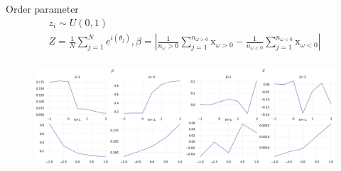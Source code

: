 \documentclass[10pt,aspectratio=43,mathserif,table]{beamer}
\begin{document}
\begin{frame}{Order parameter}
    $$
    \begin{array}{c}
        z_i\sim U\left( 0,1 \right)\\
        Z=\frac{1}{N}\sum_{j=1}^N{e^{i\left( \theta _j \right)}},  \beta =\left| \frac{1}{n_{\omega}>0}\sum_{j=1}^{n_{\omega >0}}{\mathrm{x}_{\omega >0}}-\frac{1}{n_{\omega <0}}\sum_{j=1}^{n_{\omega <0}}{\mathrm{x}_{\omega <0}} \right|\\
    \end{array}
    $$

    \begin{figure}
        \centering
        \includegraphics[width=\textwidth]{
            FreqCoupledChiralSwarmalators3DUrandbetaZ.png
        }
    \end{figure}
\end{frame}
\end{document}
